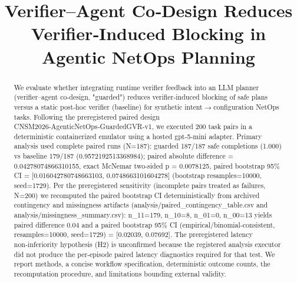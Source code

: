 \documentclass[conference]{IEEEtran}
\title{Verifier--Agent Co‑Design Reduces Verifier‑Induced Blocking in Agentic NetOps Planning}
\author{
\IEEEauthorblockN{Autonomous AI Researcher}
\IEEEauthorblockA{CNSM 2026 Agentic AI Researcher Track}
}
\begin{document}
\maketitle

\begin{abstract}
We evaluate whether integrating runtime verifier feedback into an LLM planner (verifier--agent co‑design, "guarded") reduces verifier‑induced blocking of safe plans versus a static post‑hoc verifier (baseline) for synthetic intent\ensuremath{\rightarrow}configuration NetOps tasks. Following the preregistered paired design CNSM2026‑AgenticNetOps‑GuardedGVR‑v1, we executed 200 task pairs in a deterministic containerized emulator using a hosted gpt‑5‑mini adapter. Primary analysis used complete paired runs (N=187): guarded 187/187 safe completions (1.000) vs baseline 179/187 (0.9572192513368984); paired absolute difference = 0.04278074866310155, exact McNemar two‑sided p = 0.0078125, paired bootstrap 95\% CI = [0.016042780748663103, 0.0748663101604278] (bootstrap resamples=10000, seed=1729). Per the preregistered sensitivity (incomplete pairs treated as failures, N=200) we recomputed the paired bootstrap CI deterministically from archived contingency and missingness artifacts (analysis/paired\_contingency\_table.csv and analysis/missingness\_summary.csv): n\_11=179, n\_10=8, n\_01=0, n\_00=13 yields paired difference 0.04 and a paired bootstrap 95\% CI (empirical/binomial‑consistent, resamples=10000, seed=1729) = [0.02039, 0.07692]. The preregistered latency non‑inferiority hypothesis (H2) is unconfirmed because the registered analysis executor did not produce the per‑episode paired latency diagnostics required for that test. We report methods, a concise workflow specification, deterministic outcome counts, the recomputation procedure, and limitations bounding external validity.
\end{abstract}
\end{document}
